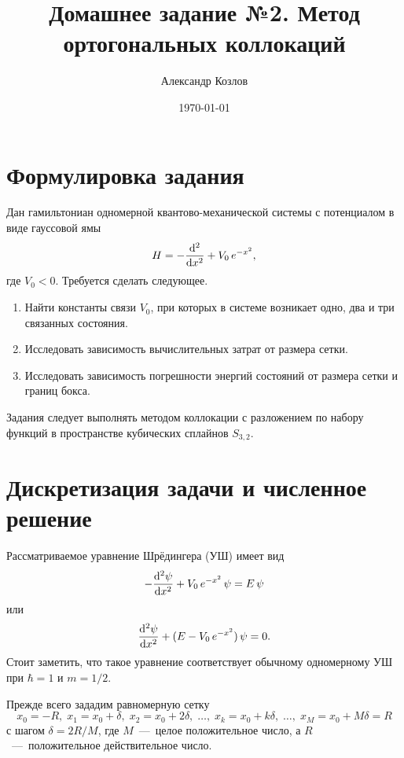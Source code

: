 \documentclass[10pt]{article}
\title{Домашнее задание №2. Метод ортогональных коллокаций}
\author{Александр Козлов}
\date{\today}
\begin{document}
\maketitle

\section*{Формулировка задания}

Дан гамильтониан одномерной квантово-механической системы с потенциалом в виде гауссовой ямы
\begin{equation}
    H = - \dv[2]{}{x} + V_0\, e^{-x^2},
\end{equation}
где $V_0 < 0$. Требуется сделать следующее.

\begin{enumerate}
    \item Найти константы связи $V_0$, при которых в системе возникает одно, два и три связанных состояния.

    \item Исследовать зависимость вычислительных затрат от размера сетки.

    \item Исследовать зависимость погрешности энергий состояний от размера сетки и границ бокса.
\end{enumerate}

Задания следует выполнять методом коллокации с разложением по набору функций в пространстве кубических сплайнов $S_{3,2}$.

\section{Дискретизация задачи и численное решение}

Рассматриваемое уравнение Шрёдингера (УШ) имеет вид
\begin{equation}
    -\dv[2]{\psi}{x} + V_0\, e^{-x^2}\, \psi  = E\, \psi
    \label{eq:SE}
\end{equation}
или
\begin{equation}
    \dv[2]{\psi}{x}  + (E - V_0\, e^{-x^2})\, \psi  = 0.
\end{equation}
Стоит заметить, что такое уравнение соответствует обычному одномерному УШ при $\hbar=1$ и $m=1/2$.

Прежде всего зададим равномерную сетку
\begin{equation}
    x_0 = -R,\; x_1 = x_0 + \delta,\; x_2 = x_0 + 2\delta,\; \ldots,\; x_k = x_0 + k\delta,\; \ldots,\; x_M = x_0 + M \delta = R
\end{equation}
с шагом $\delta = 2R/M$, где $M$~---~целое положительное число, а $R$~---~положительное действительное число.
\end{document}

